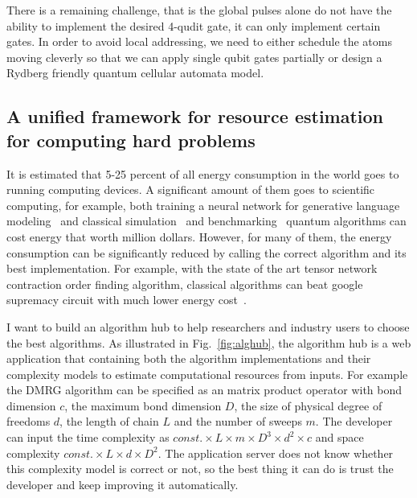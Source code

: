 \documentclass[a4paper]{article}
\newcommand{\<}{\langle}
\renewcommand{\>}{\rangle}
\begin{document}
There is a remaining challenge, that is the global pulses alone do not have the ability to implement the desired 4-qudit gate, it can only implement certain gates.
In order to avoid local addressing, we need to either schedule the atoms moving cleverly so that we can apply single qubit gates partially or design a Rydberg friendly quantum cellular automata model.

\subsection{A unified framework for resource estimation for computing hard problems}
It is estimated that 5-25 percent of all energy consumption in the world goes to running computing devices.
A significant amount of them goes to scientific computing, for example, both training a neural network for generative language modeling~\cite{Rosset2019} and classical simulation~\cite{Haner_2017} and benchmarking~\cite{Pan2021} quantum algorithms can cost energy that worth million dollars.
However, for many of them, the energy consumption can be significantly reduced by calling the correct algorithm and its best implementation.
For example, with the state of the art tensor network contraction order finding algorithm, classical algorithms can beat google supremacy circuit with much lower energy cost~\cite{Kalachev2022}.

I want to build an algorithm hub to help researchers and industry users to choose the best algorithms.
As illustrated in Fig.~\ref{fig:alghub}, the algorithm hub is a web application that containing both the algorithm implementations and their complexity models to estimate computational resources from inputs.
For example the DMRG algorithm can be specified as an matrix product operator with bond dimension $c$, the maximum bond dimension $D$, the size of physical degree of freedoms $d$, the length of chain $L$ and the number of sweeps $m$.
The developer can input the time complexity as ${const.} \times L \times m\times D^3 \times d^2 \times c$ and space complexity ${const.} \times L\times d\times D^2$.
The application server does not know whether this complexity model is correct or not, so the best thing it can do is trust the developer and keep improving it automatically.
\end{document}
